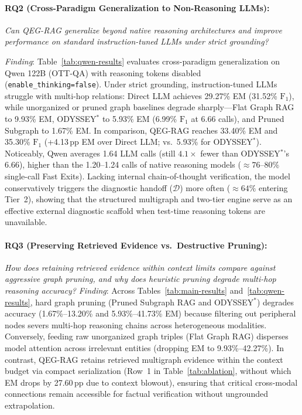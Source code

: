 \documentclass[runningheads]{llncs}
\begin{document}
\enlargethispage{2\baselineskip}
\paragraph{RQ2 (Cross-Paradigm Generalization to Non-Reasoning LLMs):}
\emph{Can QEG-RAG generalize beyond native reasoning architectures and improve performance on standard instruction-tuned LLMs under strict grounding?}

\emph{Finding}: Table~\ref{tab:qwen-results} evaluates cross-paradigm generalization on Qwen 122B (OTT-QA) with reasoning tokens disabled (\texttt{enable\_thinking=false}). Under strict grounding, instruction-tuned LLMs struggle with multi-hop relations: Direct LLM achieves 29.27\% EM (31.52\% $\text{F}_1$), while unorganized or pruned graph baselines degrade sharply---Flat Graph RAG to 9.93\% EM, ODYSSEY$^*$ to 5.93\% EM (6.99\% $\text{F}_1$ at 6.66 calls), and Pruned Subgraph to 1.67\% EM. In comparison, QEG-RAG reaches 33.40\% EM and 35.30\% $\text{F}_1$ (+4.13\,pp EM over Direct LLM; vs.\ 5.93\% for ODYSSEY$^*$). Noticeably, Qwen averages 1.64 LLM calls (still $4.1\times$ fewer than ODYSSEY$^*$'s 6.66), higher than the 1.20--1.24 calls of native reasoning models ($\approx 76\text{--}80\%$ single-call Fast Exits). Lacking internal chain-of-thought verification, the model conservatively triggers the diagnostic handoff ($\mathcal{D}$) more often ($\approx 64\%$ entering Tier~2), showing that the structured multigraph and two-tier engine serve as an effective external diagnostic scaffold when test-time reasoning tokens are unavailable.



\enlargethispage{2.0\baselineskip}
\paragraph{RQ3 (Preserving Retrieved Evidence vs.\ Destructive Pruning):}
\emph{How does retaining retrieved evidence within context limits compare against aggressive graph pruning, and why does heuristic pruning degrade multi-hop reasoning accuracy?}
\emph{Finding}: Across Tables~\ref{tab:main-results} and~\ref{tab:qwen-results}, hard graph pruning (Pruned Subgraph RAG and ODYSSEY$^*$) degrades accuracy (1.67\%--13.20\% and 5.93\%--41.73\% EM) because filtering out peripheral nodes severs multi-hop reasoning chains across heterogeneous modalities. Conversely, feeding raw unorganized graph triples (Flat Graph RAG) disperses model attention across irrelevant entities (dropping EM to 9.93\%--42.27\%). In contrast, QEG-RAG retains retrieved multigraph evidence within the context budget via compact serialization (Row~1 in Table~\ref{tab:ablation}, without which EM drops by 27.60\,pp due to context blowout), ensuring that critical cross-modal connections remain accessible for factual verification without ungrounded extrapolation.
\end{document}
